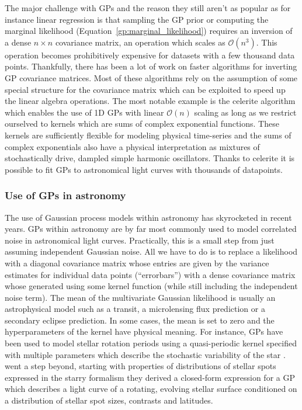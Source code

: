 \documentclass[12pt,dvipsnames]{report}
\begin{document}
The major challenge with GPs and the reason they still aren't as popular as for
instance linear regression is that sampling the GP prior or computing the
marginal likelihood (Equation~\ref{gp:marginal_likelihood}) requires an
inversion of a dense $n\times n$ covariance matrix, an operation which scales
as $\mathcal{O}(n^3)$. This operation becomes prohibitively expensive for
datasets with a few thousand data points. Thankfully, there has been a lot of
work on faster algorithms for inverting GP covariance matrices. Most of these
algorithms rely on the assumption of some special structure for the covariance
matrix which can be exploited to speed up the linear algebra operations. The
most notable example is the \textsf{celerite} algorithm
\citep{2017AJ....154..220F} which enables the use of 1D GPs with linear
$\mathcal{O}(n)$ scaling as long as we restrict ourselved to kernels which are
sums of complex exponential functions. These kernels are sufficiently flexible
for modeling physical time-series and the sums of complex exponentials also
have a physical interpretation as mixtures of stochastically drive, dampled
simple harmonic oscillators. Thanks to \textsf{celerite} it is possible to fit
GPs to astronomical light curves with thousands of datapoints.

\subsubsection{Use of GPs in astronomy}
The use of Gaussian process models within astronomy has skyrocketed in recent
years. GPs within astronomy are by far most commonly used to model correlated
noise in astronomical light curves. Practically, this is a small step from just
assuming independent Gaussian noise. All we have to do is to replace a
likelihood with a diagonal covariance matrix whose entries are given by the
variance estimates for individual data points (``errorbars'') with a dense
covariance matrix whose generated using some kernel function (while still
including the independent noise term). The mean of the multivariate Gaussian
likelihood is usually an astrophysical model such as a transit, a microlensing
flux prediction or a secondary eclipse prediction. In some cases, the mean is
set to zero and the hyperparameters of the kernel have physical meaning. For
instance, GPs have been used to model stellar rotation periods using a
quasi-periodic kernel specified with multiple parameters which describe the
stochastic variability of the star \citep{2018MNRAS.474.2094A}.
\citet{2021AJ....162..124L} went a step beyond, starting with properties of
distributions of stellar spots expressed in the \textsf{starry} formalism they
derived a closed-form expression for a GP which describes a light curve of a
rotating, evolving stellar surface conditioned on a distribution of stellar
spot sizes, contrasts and latitudes.
\end{document}
